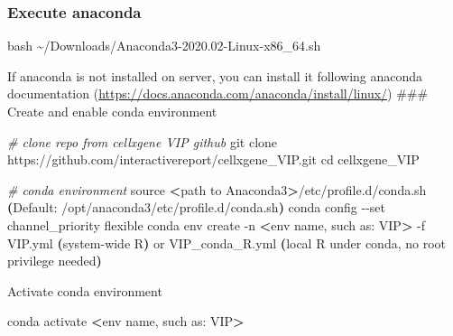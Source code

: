 \documentclass[
]{article}
\newenvironment{Shaded}{\begin{snugshade}}{\end{snugshade}}
\newcommand{\AttributeTok}[1]{\textcolor[rgb]{0.77,0.63,0.00}{#1}}
\newcommand{\BuiltInTok}[1]{#1}
\newcommand{\CommentTok}[1]{\textcolor[rgb]{0.56,0.35,0.01}{\textit{#1}}}
\newcommand{\ErrorTok}[1]{\textcolor[rgb]{0.64,0.00,0.00}{\textbf{#1}}}
\newcommand{\ExtensionTok}[1]{#1}
\newcommand{\FunctionTok}[1]{\textcolor[rgb]{0.00,0.00,0.00}{#1}}
\newcommand{\KeywordTok}[1]{\textcolor[rgb]{0.13,0.29,0.53}{\textbf{#1}}}
\newcommand{\NormalTok}[1]{#1}
\newcommand{\OperatorTok}[1]{\textcolor[rgb]{0.81,0.36,0.00}{\textbf{#1}}}
\newcommand{\VariableTok}[1]{\textcolor[rgb]{0.00,0.00,0.00}{#1}}
\begin{document}
\hypertarget{execute-anaconda}{%
\subsubsection{Execute anaconda}\label{execute-anaconda}}

\begin{Shaded}
\begin{Highlighting}[]
\FunctionTok{bash}\NormalTok{ \textasciitilde{}/Downloads/Anaconda3{-}2020.02{-}Linux{-}x86\_64.sh}
\end{Highlighting}
\end{Shaded}

If anaconda is not installed on server, you can install it following anaconda documentation (\url{https://docs.anaconda.com/anaconda/install/linux/})
\#\#\# Create and enable conda environment

\begin{Shaded}
\begin{Highlighting}[]
\CommentTok{\# clone repo from cellxgene VIP github}
\FunctionTok{git}\NormalTok{ clone https://github.com/interactivereport/cellxgene\_VIP.git}
\BuiltInTok{cd}\NormalTok{ cellxgene\_VIP}

\CommentTok{\# conda environment}
\BuiltInTok{source} \OperatorTok{\textless{}}\NormalTok{path to Anaconda3}\OperatorTok{\textgreater{}}\NormalTok{/etc/profile.d/conda.sh }\ErrorTok{(}\ExtensionTok{Default:}\NormalTok{ /opt/anaconda3/etc/profile.d/conda.sh}\KeywordTok{)}
\ExtensionTok{conda}\NormalTok{ config }\AttributeTok{{-}{-}set}\NormalTok{ channel\_priority flexible}
\ExtensionTok{conda}\NormalTok{ env create }\AttributeTok{{-}n} \OperatorTok{\textless{}}\NormalTok{env name, such as: VIP}\OperatorTok{\textgreater{}}\NormalTok{ {-}f VIP.yml }\ErrorTok{(}\ExtensionTok{system{-}wide}\NormalTok{ R}\KeywordTok{)} \ExtensionTok{or}\NormalTok{ VIP\_conda\_R.yml }\ErrorTok{(}\BuiltInTok{local} \VariableTok{R} \VariableTok{under} \VariableTok{conda}\NormalTok{, }\VariableTok{no} \VariableTok{root} \VariableTok{privilege} \VariableTok{needed}\KeywordTok{)}
\end{Highlighting}
\end{Shaded}

Activate conda environment

\begin{Shaded}
\begin{Highlighting}[]
\ExtensionTok{conda}\NormalTok{ activate }\OperatorTok{\textless{}}\NormalTok{env name, such as: VIP}\OperatorTok{\textgreater{}}
\end{Highlighting}
\end{Shaded}
\end{document}
